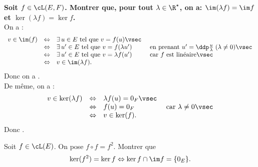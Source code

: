 \documentclass[a4paper, 11pt,reqno]{article}
\begin{document}
\begin{correction}  \;
	\textbf{Soit $f\in\cL(E,F)$. Montrer que, pour tout $\lambda\in\R^{\star}$, on a: $\im (\lambda f)=\im f$ et $\ker (\lambda f)=\ker f$. }\\
	On a  :
	$$\begin{array}{rcll}
			v \in \im (f) & \Leftrightarrow & \exists \, u \in E \textmd{ tel que } v = f(u)\vsec                                                                                 \\
			              & \Leftrightarrow & \exists \, u' \in E \textmd{ tel que } v = f(\lambda u') & \textmd{ en prenant } u'=\ddp \frac{u}{\lambda} \; (\lambda \not=0)\vsec \\
			              & \Leftrightarrow & \exists \, u' \in E \textmd{ tel que } v = \lambda f(u') & \textmd{ car $f$ est lin\'eaire} \vsec                                   \\
			              & \Leftrightarrow & v \in \im (\lambda f) .
		\end{array}$$
	Donc on a .\\
	De m\^eme, on a :
	$$\begin{array}{rcll}
			v \in \ker (\lambda f) & \Leftrightarrow & \lambda f(u) = 0_F\vsec                                       \\
			                       & \Leftrightarrow & f(u) = 0_F              & \textmd{ car } \lambda \not=0 \vsec \\
			                       & \Leftrightarrow & v \in \ker (f) .
		\end{array}$$
	Donc .
\end{correction}
\begin{exercice}  \;
	Soit $f\in\cL(E)$. On pose $f\circ f=f^2$. Montrer que
	$$\ker (f^2)=\ker f \Leftrightarrow \ker f \cap \im f =\lbrace 0_E\rbrace.$$
\end{exercice}
\end{document}
